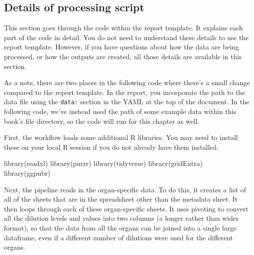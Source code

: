 \documentclass[
]{book}
\newenvironment{Shaded}{\begin{snugshade}}{\end{snugshade}}
\newcommand{\FunctionTok}[1]{\textcolor[rgb]{0.00,0.00,0.00}{#1}}
\newcommand{\NormalTok}[1]{#1}
\begin{document}
\hypertarget{details-of-processing-script-1}{%
\subsection{Details of processing script}\label{details-of-processing-script-1}}

This section goes through the code within the report template. It
explains each part of the code in detail. You do not need to understand
these details to use the report template. However, if you have questions
about how the data are being processed, or how the outputs are created,
all those details are available in this section.

As a note, there are two places in the following code where there's a small
change compared to the report template. In the report, you incorporate the path
to the data file using the \texttt{data:} section in the YAML at the top of the
document. In the following code, we've instead used the path of some example
data within this book's file directory, so the code will run for this chapter as
well.

First, the workflow loads some additional R libraries. You may need to install
these on your local R session if you do not already have them installed.

\begin{Shaded}
\begin{Highlighting}[]
\FunctionTok{library}\NormalTok{(readxl)}
\FunctionTok{library}\NormalTok{(purrr)}
\FunctionTok{library}\NormalTok{(tidyverse)}
\FunctionTok{library}\NormalTok{(gridExtra)}
\FunctionTok{library}\NormalTok{(ggpubr)}
\end{Highlighting}
\end{Shaded}

Next, the pipeline reads in the organ-specific data. To do this, it creates a
list of all of the sheets that are in the spreadsheet other than the metadata
sheet. It then loops through each of these organ-specific sheets. It uses
pivoting to convert all the dilution levels and values into two columns
(a longer rather than wider format), so that the data from all the organs can
be joined into a single large dataframe, even if a different number of dilutions
were used for the different organs.
\end{document}
